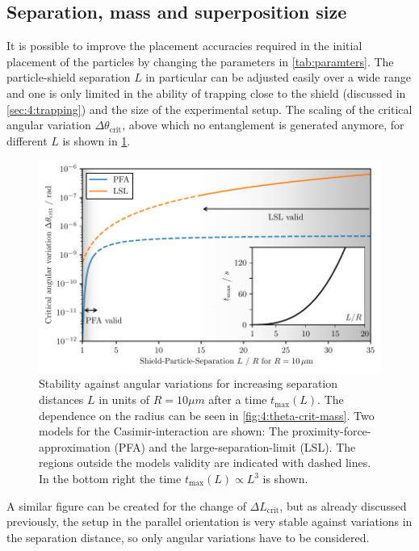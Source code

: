 \newpage
\subsection{Separation, mass and superposition size}
It is possible to improve the placement accuracies required in the initial placement of the particles by changing the parameters in \cref{tab:paramters}.
The particle-shield separation $L$ in particular can be adjusted easily over a wide range and one is only limited in the ability of trapping close to the shield (discussed in \cref{sec:4:trapping}) and the size of the experimental setup.
The scaling of the critical angular variation $\Delta \theta_\mathrm{crit}$, above which no entanglement is generated anymore, for different $L$ is shown in \cref{fig:4:theta-crit-L}.
\begin{figure}[!htbp]
  \centering
  \includegraphics[width=\textwidth]{./../figures/theta-variance/theta-crit-L.pdf}
  \caption{Stability against angular variations for increasing separation distances $L$ in units of $R=10\si{\mu m}$ after a time $t_\mathrm{max}(L)$. The dependence on the radius can be seen in \cref{fig:4:theta-crit-mass}. Two models for the Casimir-interaction are shown: The proximity-force-approximation (PFA) and the large-separation-limit (LSL). The regions outside the models validity are indicated with dashed lines. In the bottom right the time $t_\mathrm{max}(L) \propto L^3$ is shown.}
  \label{fig:4:theta-crit-L}
\end{figure}
A similar figure can be created for the change of $\Delta L_\mathrm{crit}$, but as already discussed previously, the setup in the parallel orientation is very stable against variations in the separation distance, so only angular variations have to be considered.

